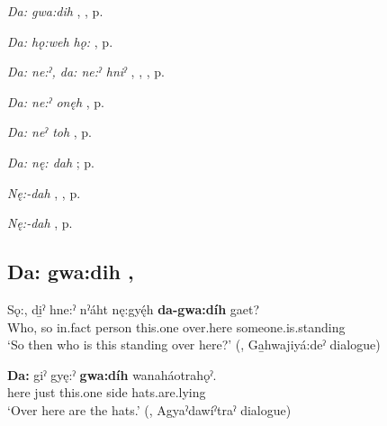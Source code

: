 \begin{CayugaRelated}
\item \textit{Da: gwa:dih} , , p. \pageref{p:[da: gwa:dih]}\\
\item \textit{Da: hǫ:weh hǫ:} , p. \pageref{p:[da: hǫ:weh hǫ:]}\\
\item \textit{Da: ne:ˀ, da: ne:ˀ hniˀ} , , , p. \pageref{p:[da: ne:ˀ, da: ne:ˀ hniˀ]}\\
\item \textit{Da: ne:ˀ onęh} , p. \pageref{p:[da: ne:ˀ onęh]}\\
\item \textit{Da: neˀ toh} , p. \pageref{p:[da: neˀ toh]}\\
\item \textit{Da: nę: dah} ; p. \pageref{p:[da: nę: dah]}\\
\item \textit{Nę:-dah} , , p. \pageref{p:[nę:-dah] `this’, ‘this way’}\\
\item \textit{Nę:-dah} , p. \pageref{p:[nę:-dah] ‘Here!’}
\end{CayugaRelated}

\subsection*{\textbf{Da: gwa:dih} , } \label{p:[da: gwa:dih]}

\ea
\label{ex:dpart71}
\gll Sǫ:, di̱ˀ  hne:ˀ nˀáht nę:gyę́h \textbf{da-gwa:díh} gaet?\\
Who, so  in.fact person this.one over.here someone.is.standing\\
\glt ‘So then who is this standing over here?’ (\cite[257]{mithun_watewayestanih_1984}, Ga̱hwajiyá:deˀ dialogue)
\z

\ea
\label{ex:dpart72}
\gll \textbf{Da:} giˀ gyę:ˀ \textbf{gwa:díh} wanaháotrahǫˀ.\\
here just this.one side hats.are.lying\\
\glt ‘Over here are the hats.’ (\cite[225]{mithun_watewayestanih_1984}, Agyaˀdawíˀtraˀ dialogue)
\z

